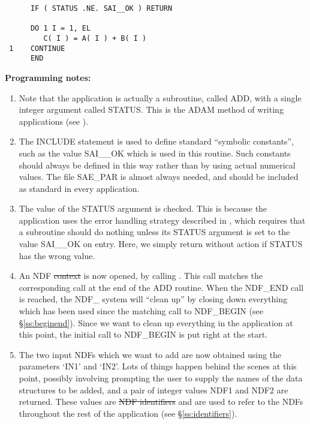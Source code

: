 \begin{verbatim}
      IF ( STATUS .NE. SAI__OK ) RETURN                       
                                                              
      DO 1 I = 1, EL                                          
         C( I ) = A( I ) + B( I )                             
 1    CONTINUE                                                
      END                                                     
\end{verbatim}
\normalsize

{\bf Programming notes:}

\begin{enumerate}

\item Note that the application is actually a subroutine, called ADD,
with a single integer argument called STATUS.  This is the ADAM method
of writing applications (see ).

\item The INCLUDE statement is used to define standard ``symbolic
constants'', such as the value SAI\_\_OK which is used in this
routine.  Such constants should always be defined in this way rather
than by using actual numerical values.  The file SAE\_PAR is almost
always needed, and should be included as standard in every
application.

\item The value of the STATUS argument is checked.  This is because
the application uses the error handling strategy described in
, which requires that a
subroutine should do nothing unless its STATUS argument is set to the
value SAI\_\_OK on entry.  Here, we simply return without action if
STATUS has the wrong value.

\item An NDF \st{context\/} is now opened, by calling . 
This call matches the corresponding  call at the end of the ADD
routine. 
When the NDF\_END call is reached, the NDF\_ system will ``clean up'' by
closing down everything which has been used since the matching call to
NDF\_BEGIN (see \S\ref{ss:beginend}). 
Since we want to clean up everything in the application at this point, the 
initial call to NDF\_BEGIN is put right at the start. 

\item The two input NDFs which we want to add are now obtained using the
parameters `IN1' and `IN2'. 
Lots of things happen behind the scenes at this point, possibly involving
prompting the user to supply the names of the data structures to be added,
and a pair of integer values NDF1 and NDF2 are returned. 
These values are \st{NDF identifiers\/} and are used to refer to the NDFs
throughout the rest of the application (see \S\ref{ss:identifiers}).


\end{enumerate}
